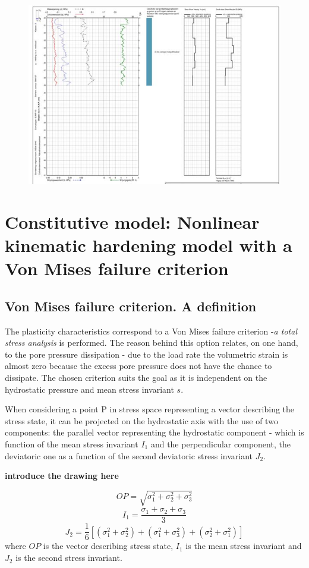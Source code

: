 \documentclass[12pt,a4paper]{report}
\begin{document}
\begin{figure}[h!]
	\centering
	\includegraphics[width=0.8\linewidth]{"cpt2"}
\end{figure}

\newpage
\chapter{Constitutive model: Nonlinear kinematic hardening model with a Von Mises failure criterion} \label{App:AppendixB}
\section{Von Mises failure criterion. A definition}
The plasticity characteristics correspond to a Von Mises failure criterion -\textit{a total stress analysis } is performed. The reason behind this option relates, on one hand, to the pore pressure dissipation - due to the load rate the volumetric strain is almost zero because the excess pore pressure does not have the chance to dissipate.  The chosen criterion suits the goal as it is independent on the hydrostatic pressure and mean stress invariant $s$.

When considering a point P in stress space representing a vector describing the stress state, it can be projected on the hydrostatic axis with the use of two components: the parallel vector representing the hydrostatic component - which is function of the mean stress invariant $I_1$ and the perpendicular component, the deviatoric one as a function of the second deviatoric stress invariant $J_2$.

\textbf{introduce the drawing here}

\begin{equation}
	OP=\sqrt{\sigma_1^2+\sigma_2^2+\sigma_3^2}
\end{equation}
\begin{equation}
	I_1=\frac{\sigma_1+\sigma_2+\sigma_3}{3} 	
\end{equation}
\begin{equation}
	 J_2=\frac{1}{6}[(\sigma_1^2+\sigma_2^2)+(\sigma_1^2+\sigma_3^2)+(\sigma_2^2+\sigma_1^2)] 
\end{equation}
where
$OP$ is  the vector describing stress state, $I_1$ is the mean stress invariant and $J_2$ is the second stress invariant.
\end{document}
